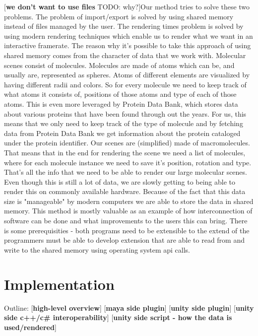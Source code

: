 \documentclass[
  digital, %
  table,   %
  nolof,     %
  nolot,     %
]{fithesis3}
\begin{document}
[\textbf{we don't want to use files} TODO: why?]Our method tries to solve these two problems. The problem of import/export is solved by using shared memory instead of files managed by the user. The rendering times problem is solved by using modern rendering techniques which enable us to render what we want in an interactive framerate.
The reason why it's possible to take this approach of using shared memory comes from the character of data that we work with. Molecular scenes consist of molecules. Molecules are made of atoms which can be, and usually are, represented as spheres. Atoms of different elements are visualized by having different radii and colors. So for every molecule we need to keep track of what atoms it consists of, positions of those atoms and type of each of those atoms. This is even more leveraged by Protein Data Bank, which stores data about various proteins that have been found through out the years. For us, this means that we only need to keep track of the type of molecule and by fetching data from Protein Data Bank we get information about the protein cataloged under the protein identifier. Our scenes are (simplified) made of macromolecules. That means that in the end for rendering the scene we need a list of molecules, where for each molecule instance we need to save it's position, rotation and type. That's all the info that we need to be able to render our large molecular scenes. Even though this is still a lot of data, we are slowly getting to being able to render this on commonly available hardware. Because of the fact that this data size is "manageable" by modern computers we are able to store the data in shared memory.
This method is mostly valuable as an example of how interconnection of software can be done and what improvements to the users this can bring. There is some prerequisities - both programs need to be extensible to the extend of the programmers must be able to develop extension that are able to read from and write to the shared memory using operating system api calls.

\chapter{Implementation}
Outline:
[\textbf{high-level overview}]
[\textbf{maya side plugin}]
[\textbf{unity side plugin}]
[\textbf{unity side c++/c\# interoperability}]
[\textbf{unity side script - how the data is used/rendered}]
\end{document}
